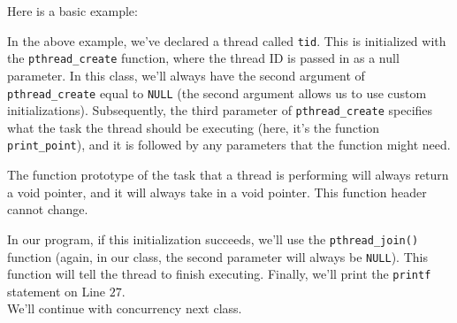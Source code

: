 Here is a basic example:


\lstset{caption=Threads Example 1}
\begin{center}

\end{center}

In the above example, we've declared a thread called \verb!tid!. This is initialized with the \verb!pthread_create! function, where the thread ID is passed in as a null parameter. In this class, we'll always have the second argument of \verb!pthread_create! equal to \verb!NULL! (the second argument allows us to use custom initializations). Subsequently, the third parameter of \verb!pthread_create! specifies what the task the thread should be executing (here, it's the function \verb!print_point!), and it is followed by any parameters that the function might need. 


The function prototype of the task that a thread is performing will always return a void pointer, and it will always take in a void pointer. This function header cannot change.

In our program, if this initialization succeeds, we'll use the \verb!pthread_join()! function (again, in our class, the second parameter will always be \verb!NULL!). This function will tell the thread to finish executing. Finally, we'll print the \verb!printf! statement on Line $27$. \\

We'll continue with concurrency next class.
